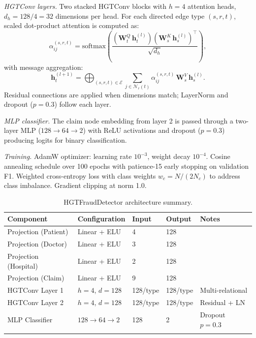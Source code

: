 \documentclass[pdflatex,sn-mathphys-num]{sn-jnl}
\theoremstyle{thmstyleone}
\theoremstyle{thmstyletwo}
\theoremstyle{thmstylethree}
\begin{document}
\textit{HGTConv layers.} Two stacked HGTConv blocks with $h=4$
attention heads, $d_h = 128/4 = 32$ dimensions per head. For each
directed edge type $(s, r, t)$, scaled dot-product attention is
computed as:
\begin{equation}
  \alpha_{ij}^{(s,r,t)} = \text{softmax}\!\left(
    \frac{\left(\mathbf{W}_t^Q\,\mathbf{h}_t^{(l)}\right)
          \left(\mathbf{W}_s^K\,\mathbf{h}_s^{(l)}\right)^\top}
         {\sqrt{d_h}}
  \right),
\end{equation}
with message aggregation:
\begin{equation}
  \mathbf{h}_t^{(l+1)} =
  \bigoplus_{(s,r,t) \in \mathcal{E}}
  \sum_{j \in \mathcal{N}_r(t)} \alpha_{ij}^{(s,r,t)}\,
  \mathbf{W}_s^V\,\mathbf{h}_s^{(l)}.
\end{equation}
Residual connections are applied when dimensions match; LayerNorm and
dropout ($p = 0.3$) follow each layer.

\textit{MLP classifier.} The claim node embedding from layer 2 is
passed through a two-layer MLP ($128 \to 64 \to 2$) with ReLU
activations and dropout ($p = 0.3$) producing logits for binary
classification.

\textit{Training.} AdamW optimizer: learning rate $10^{-3}$, weight
decay $10^{-4}$. Cosine annealing schedule over 100 epochs with
patience-15 early stopping on validation F1. Weighted cross-entropy
loss with class weights $w_c = N / (2 N_c)$ to address class
imbalance. Gradient clipping at norm 1.0.

\begin{table}[h]
\caption{HGTFraudDetector architecture summary.}\label{tab:architecture}
\begin{tabular}{@{}lllll@{}}
\toprule
Component & Configuration & Input & Output & Notes \\
\midrule
Projection (Patient) & Linear + ELU & 4 & 128 & \\
Projection (Doctor) & Linear + ELU & 3 & 128 & \\
Projection (Hospital) & Linear + ELU & 2 & 128 & \\
Projection (Claim) & Linear + ELU & 9 & 128 & \\
HGTConv Layer 1 & $h=4$, $d=128$ & 128/type & 128/type & Multi-relational \\
HGTConv Layer 2 & $h=4$, $d=128$ & 128/type & 128/type & Residual + LN \\
MLP Classifier & $128\!\to\!64\!\to\!2$ & 128 & 2 & Dropout $p\!=\!0.3$ \\
\botrule
\end{tabular}
\end{table}
\end{document}
